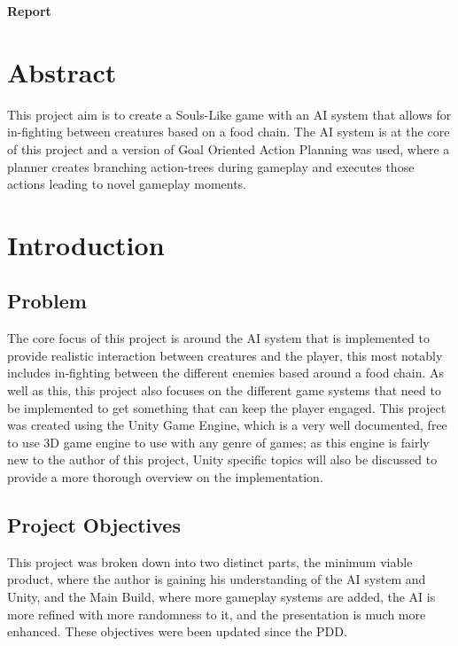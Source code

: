 \documentclass[11pt]{report}
\begin{document}
\begin{titlepage}
\center
{\huge\bfseries Report}  
\end{titlepage}

\tableofcontents

\chapter{Abstract}
This project aim is to create a Souls-Like game with an AI system that allows for in-fighting between creatures based on a food chain. The AI system is at the core of this project and a version of Goal Oriented Action Planning was used, where a planner creates branching action-trees during gameplay and executes those actions leading to novel gameplay moments.

\chapter{Introduction}
\section{Problem}
The core focus of this project is around the AI system that is implemented to provide realistic interaction between creatures and the player, this most notably includes in-fighting between the different enemies based around a food chain. As well as this, this project also focuses on the different game systems that need to be implemented to get something that can keep the player engaged. This project was created using the Unity Game Engine, which is a very well documented, free to use 3D game engine to use with any genre of games; as this engine is fairly new to the author of this project, Unity specific topics will also be discussed to provide a more thorough overview on the implementation.

\section{Project Objectives}
This project was broken down into two distinct parts, the minimum viable product, where the author is gaining his understanding of the AI system and Unity, and the Main Build, where more gameplay systems are added, the AI is more refined with more randomness to it, and the presentation is much more enhanced. These objectives were been updated since the PDD.
\end{document}
